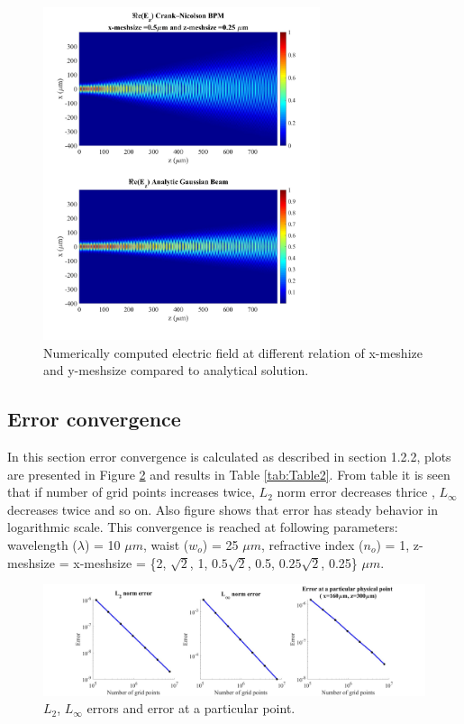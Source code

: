 \documentclass[a4paper]{article}
\begin{document}
	\begin{figure}[H]
		\hspace{-24.5mm}
		\includegraphics[width=0.725\textwidth]{change5.jpg}	
		\caption{\label{fig:Relation} Numerically computed electric field at different relation of x-meshize and y-meshsize compared to analytical solution.}
	\end{figure}
	
	\subsection{Error convergence}
	In this section error convergence is calculated as described in section 1.2.2, plots are presented in Figure \ref{fig:Error} and results in Table \ref{tab:Table2}. From table it is seen that if number of grid points increases twice, $L_{2}$ norm error decreases thrice , $L_{\infty}$ decreases twice and so on. Also figure shows that error has steady behavior in logarithmic scale. This convergence is reached at following parameters: wavelength ($\lambda$) = 10 $\mu m$, waist ($w_o$) = 25 $\mu m$, refractive index ($n_o$) = 1, z-meshsize = x-meshsize  = \{2, $\sqrt{2}$, 1, $0.5\sqrt{2}$, 0.5, $0.25\sqrt{2}$, 0.25\} $\mu m$.
	\begin{figure}[H]
		\hspace{-30mm}
		\includegraphics[width=1.5\textwidth]{error.jpg}
		\caption{\label{fig:Error} $L_{2}$, $L_{\infty}$ errors and error at a particular point.}
	\end{figure}
	
\end{document}
